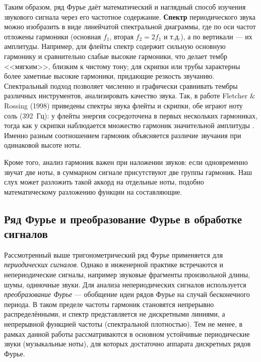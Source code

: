 \documentclass[bachelor, och, diploma]{SCWorks}
\begin{document}
Таким образом, ряд Фурье даёт математический и наглядный способ изучения звукового сигнала через его частотное содержание. \textbf{Спектр} периодического звука можно изобразить в виде линейчатой спектральной диаграммы, где по оси частот отложены гармоники (основная $f_1$, вторая $f_2=2f_1$ и т.д.), а по вертикали --- их амплитуды. Например, для флейты спектр содержит сильную основную гармонику и сравнительно слабые высокие гармоники, что делает тембр <<мягким>>, близким к чистому тону; для скрипки или трубы характерны более заметные высокие гармоники, придающие резкость звучанию\cite{fletcher}. Спектральный подход позволяет численно и графически сравнивать тембры различных инструментов, анализировать качество звука. Так, в работе Fletcher \& Rossing (1998) приведены спектры звука флейты и скрипки, обе играют ноту соль (392~Гц): у флейты энергия сосредоточена в первых нескольких гармониках, тогда как у скрипки наблюдается множество гармоник значительной амплитуды \cite{fletcher}. Именно разным соотношением гармоник объясняется различие звучания при одинаковой высоте ноты.

Кроме того, анализ гармоник важен при наложении звуков: если одновременно звучат две ноты, в суммарном сигнале присутствуют две группы гармоник. Наш слух может разложить такой аккорд на отдельные ноты, подобно математическому разложению функции на составляющие.

\subsection{Ряд Фурье и преобразование Фурье в обработке сигналов}

Рассмотренный выше тригонометрический ряд Фурье применяется для \textit{периодических сигналов}. Однако в инженерной практике встречаются и непериодические сигналы, например звуковые фрагменты произвольной длины, шумы, одиночные звуки. Для анализа непериодических сигналов используется \textit{преобразование Фурье} --- обобщение идеи рядов Фурье на случай бесконечного периода. В таком пределе частоты гармоник становятся непрерывно распределёнными, и спектр представляется не дискретными линиями, а непрерывной функцией частоты (спектральной плотностью). Тем не менее, в рамках данной работы рассматриваются в основном устойчивые периодические звуки (музыкальные ноты), для которых достаточно аппарата дискретных рядов Фурье.

\end{document}
